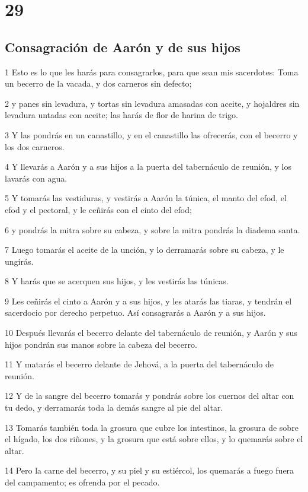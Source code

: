 \chapter{29}

\section*{Consagración de Aarón y de sus hijos}

\par 1 Esto es lo que les harás para consagrarlos, para que sean mis sacerdotes: Toma un becerro de la vacada, y dos carneros sin defecto;
\par 2 y panes sin levadura, y tortas sin levadura amasadas con aceite, y hojaldres sin levadura untadas con aceite; las harás de flor de harina de trigo.
\par 3 Y las pondrás en un canastillo, y en el canastillo las ofrecerás, con el becerro y los dos carneros.
\par 4 Y llevarás a Aarón y a sus hijos a la puerta del tabernáculo de reunión, y los lavarás con agua.
\par 5 Y tomarás las vestiduras, y vestirás a Aarón la túnica, el manto del efod, el efod y el pectoral, y le ceñirás con el cinto del efod;
\par 6 y pondrás la mitra sobre su cabeza, y sobre la mitra pondrás la diadema santa.
\par 7 Luego tomarás el aceite de la unción, y lo derramarás sobre su cabeza, y le ungirás.
\par 8 Y harás que se acerquen sus hijos, y les vestirás las túnicas.
\par 9 Les ceñirás el cinto a Aarón y a sus hijos, y les atarás las tiaras, y tendrán el sacerdocio por derecho perpetuo. Así consagrarás a Aarón y a sus hijos.
\par 10 Después llevarás el becerro delante del tabernáculo de reunión, y Aarón y sus hijos pondrán sus manos sobre la cabeza del becerro.
\par 11 Y matarás el becerro delante de Jehová, a la puerta del tabernáculo de reunión.
\par 12 Y de la sangre del becerro tomarás y pondrás sobre los cuernos del altar con tu dedo, y derramarás toda la demás sangre al pie del altar.
\par 13 Tomarás también toda la grosura que cubre los intestinos, la grosura de sobre el hígado, los dos riñones, y la grosura que está sobre ellos, y lo quemarás sobre el altar.
\par 14 Pero la carne del becerro, y su piel y su estiércol, los quemarás a fuego fuera del campamento; es ofrenda por el pecado.
